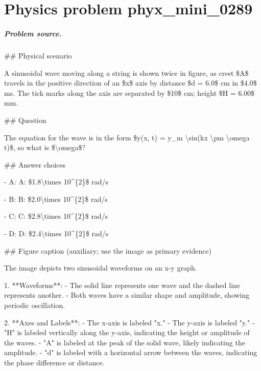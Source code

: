
\chapter{Physics problem phyx\_mini\_0289}
\label{ch:PhyXMiniProblems_problem_phyx_mini_0289}

\paragraph{Problem source.}
\#\# Physical scenario

A sinusoidal wave moving along a string is shown twice in figure, as crest \$A\$ travels in the positive direction of an \$x\$ axis by distance \$d = 6.0\$ cm in \$4.0\$ ms. The tick marks along the axis are separated by \$10\$ cm; height \$H = 6.00\$ mm.

\#\# Question

The equation for the wave is in the form \$y(x, t) = y\_m \textbackslash{}sin(kx \textbackslash{}pm \textbackslash{}omega t)\$, so what is \$\textbackslash{}omega\$?

\#\# Answer choices

- A: A: \$1.8\textbackslash{}times 10\textasciicircum{}\{2\}\$ rad/s

- B: B: \$2.0\textbackslash{}times 10\textasciicircum{}\{2\}\$ rad/s

- C: C: \$2.8\textbackslash{}times 10\textasciicircum{}\{2\}\$ rad/s

- D: D: \$2.4\textbackslash{}times 10\textasciicircum{}\{2\}\$ rad/s

\#\# Figure caption (auxiliary; use the image as primary evidence)

The image depicts two sinusoidal waveforms on an x-y graph. 

1. **Waveforms**:
   - The solid line represents one wave and the dashed line represents another.
   - Both waves have a similar shape and amplitude, showing periodic oscillation.

2. **Axes and Labels**:
   - The x-axis is labeled "x."
   - The y-axis is labeled "y."
   - "H" is labeled vertically along the y-axis, indicating the height or amplitude of the waves.
   - "A" is labeled at the peak of the solid wave, likely indicating the amplitude.
   - "d" is labeled with a horizontal arrow between the waves, indicating the phase difference or distance.

